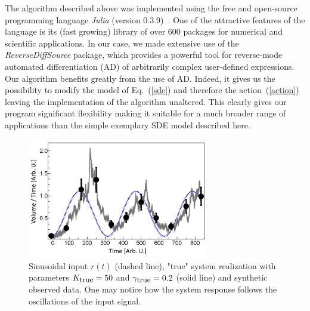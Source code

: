 \documentclass[12pt,a4paper,final]{iopart}
\begin{document}
The algorithm described above was implemented using the free and open-source programming language \emph{Julia} (version 0.3.9)~\cite{julia_web}. One of the attractive features of the language is its (fast growing) library of over 600 packages for numerical and scientific applications.
In our case, we made extensive use of the \emph{ReverseDiffSource} package, which provides a powerful tool for reverse-mode automated differentiation (AD) of arbitrarily complex user-defined expressions. Our algorithm benefits greatly from the use of AD. Indeed, it gives us the possibility to modify the model of Eq.~(\ref{sde}) and therefore the action~(\ref{action}) leaving the implementation of the algorithm unaltered. This clearly gives our program significant flexibility making it suitable for a much broader range of applications than the simple exemplary SDE model described here.
%
\begin{figure}[htb!]
    \centering
    \includegraphics[width=0.7\textwidth]{Figs/FigRainData.png}
    \caption{\label{fig:rain_data_S}Sinusoidal input $r(t)$ (dashed line), "true" system realization with parameters $K_{\mbox{\small true}} = 50$ and $\gamma_{\mbox{\small true}} = 0.2$ (solid line) and synthetic observed data. One may notice how the system response follows the oscillations of the input signal.}
\end{figure}
\end{document}
